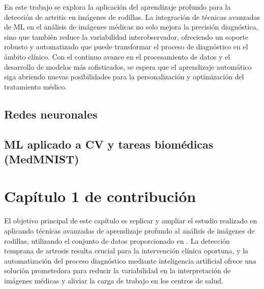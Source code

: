 \documentclass[11pt,spanish,listoffigures,listoftables]{tfgetsinf}
\begin{document}
En este trabajo se explora la aplicación del aprendizaje profundo para la detección de artritis en imágenes de rodillas. La integración de técnicas avanzadas de ML en el análisis de imágenes médicas no solo mejora la precisión diagnóstica, sino que también reduce la variabilidad interobservador, ofreciendo un soporte robusto y automatizado que puede transformar el proceso de diagnóstico en el ámbito clínico. Con el continuo avance en el procesamiento de datos y el desarrollo de modelos más sofisticados, se espera que el aprendizaje automático siga abriendo nuevas posibilidades para la personalización y optimización del tratamiento médico.








\section{Redes neuronales}           %

\section{ML aplicado a CV y tareas biomédicas (MedMNIST)} %


\chapter{Capítulo 1 de contribución}  %

El objetivo principal de este capítulo es replicar y ampliar el estudio realizado en \cite{10863523} aplicando técnicas avanzadas de aprendizaje profundo al análisis de imágenes de rodillas, utilizando el conjunto de datos proporcionado en \cite{chen2018knee}. La detección temprana de artrosis resulta crucial para la intervención clínica oportuna, y la automatización del proceso diagnóstico mediante inteligencia artificial ofrece una solución prometedora para reducir la variabilidad en la interpretación de imágenes médicas y aliviar la carga de trabajo en los centros de salud.
\end{document}
